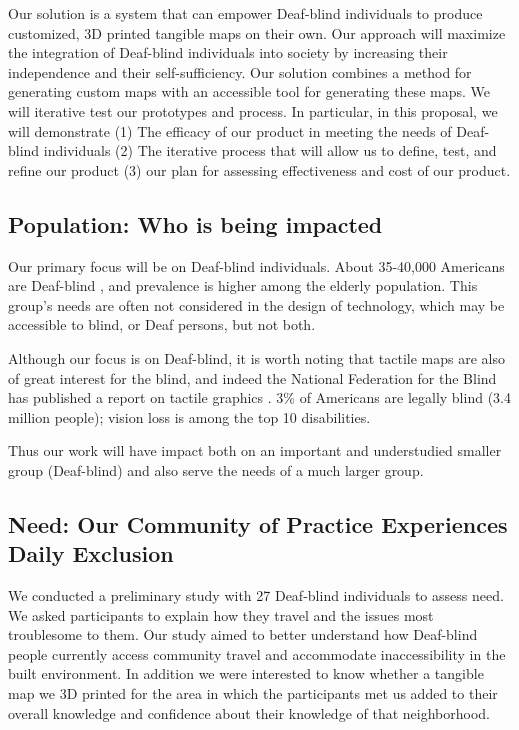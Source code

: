 Our solution is a system that can empower Deaf-blind individuals to produce  customized, 3D printed tangible maps on their own.
Our approach will maximize the integration of Deaf-blind individuals into society by increasing their independence and their self-sufficiency.
Our solution combines a method for generating custom maps with an accessible tool for generating these maps.
We will iterative test our prototypes and process.
In particular, in this proposal, we will demonstrate (1) The efficacy of our product in meeting the needs of Deaf-blind individuals (2)  The iterative process that will allow us to define, test, and refine our product (3) our plan for assessing effectiveness and cost of our product. 

\subsection{Population: Who is being impacted}

Our primary focus will be on Deaf-blind individuals. About 35-40,000 Americans are Deaf-blind \cite{watson1993model}, and prevalence is higher among the elderly population. This group's needs are often not considered in the design of technology, which may be accessible to blind, or Deaf persons, but not both.

Although our focus is on Deaf-blind, it is worth noting that tactile maps are also of great interest for the blind, and indeed the National Federation for the Blind has published a report on tactile graphics \cite{lobben2015tactile}. 3\% of Americans are legally blind (3.4 million people); vision loss is among the top 10 disabilities.

Thus our work will have impact both on an important and understudied smaller group (Deaf-blind) and also serve the needs of a much larger group. 

\subsection{Need: Our Community of Practice Experiences Daily Exclusion}

We conducted a  preliminary study with 27 Deaf-blind individuals to assess need. We asked participants to explain how they travel and the issues most troublesome to them. 
Our study aimed to better understand how Deaf-blind people currently access community travel and 
accommodate inaccessibility in the built environment. In addition we were interested to know whether a tangible map we 3D printed for the area in which the participants met us added to their overall knowledge and confidence about their knowledge of that neighborhood.

